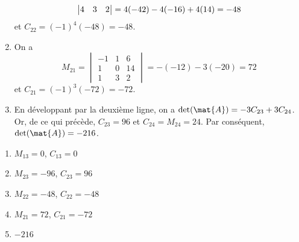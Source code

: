\begin{exercice}
\begin{sol}
\begin{enumerate}
\begin{displaymath}
\begin{vmatrix}
          4 &  3 &  2
        \end{vmatrix}
        = 4(-42) - 4(-16) + 4(14) \\
        = -48
      \end{displaymath}
      et $C_{22} = (-1)^4 (-48) = -48$.
    \item On a
      \begin{displaymath}
        M_{21}
        =
        \begin{vmatrix}
          -1 &  1 &  6 \\
           1 &  0 & 14 \\
           1 &  3 &  2
        \end{vmatrix}
        = -(-12 ) - 3(-20)
        = 72
      \end{displaymath}
      et $C_{21} = (-1)^3 (-72) = -72$.
    \item En développant par la deuxième ligne, on a $\det(\mat{A}) =
      -3 C_{23} + 3 C_{24}$. Or, de ce qui précède, $C_{23} = 96$ et
      $C_{24} = M_{24} = 24$. Par conséquent, $\det(\mat{A}) = -216$.
    \end{enumerate}
  \end{sol}
  \begin{rep}
    \begin{enumerate}
    \item $M_{13} =   0$, $C_{13} =   0$
    \item $M_{23} = -96$, $C_{23} =  96$
    \item $M_{22} = -48$, $C_{22} = -48$
    \item $M_{21} =  72$, $C_{21} = -72$
    \item $-216$
    \end{enumerate}
  \end{rep}
\end{exercice}





